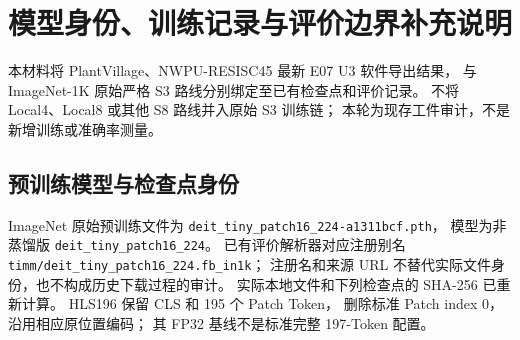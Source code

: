 \section{模型身份、训练记录与评价边界补充说明}
\label{app:model_training_data_evidence}

本材料将 PlantVillage、NWPU-RESISC45 最新 E07 U3 软件导出结果，
与 ImageNet-1K 原始严格 S3 路线分别绑定至已有检查点和评价记录。
不将 Local4、Local8 或其他 S8 路线并入原始 S3 训练链；
本轮为现存工件审计，不是新增训练或准确率测量。

\subsection{预训练模型与检查点身份}
ImageNet 原始预训练文件为
\texttt{deit\_tiny\_patch16\_224-a1311bcf.pth}，
模型为非蒸馏版 \texttt{deit\_tiny\_patch16\_224}。
已有评价解析器对应注册别名
\texttt{timm/deit\_tiny\_patch16\_224.fb\_in1k}；
注册名和来源 URL 不替代实际文件身份，也不构成历史下载过程的审计。
实际本地文件和下列检查点的 SHA-256 已重新计算。
HLS196 保留 CLS 和 195 个 Patch Token，
删除标准 Patch index 0，沿用相应原位置编码；
其 FP32 基线不是标准完整 197-Token 配置。

